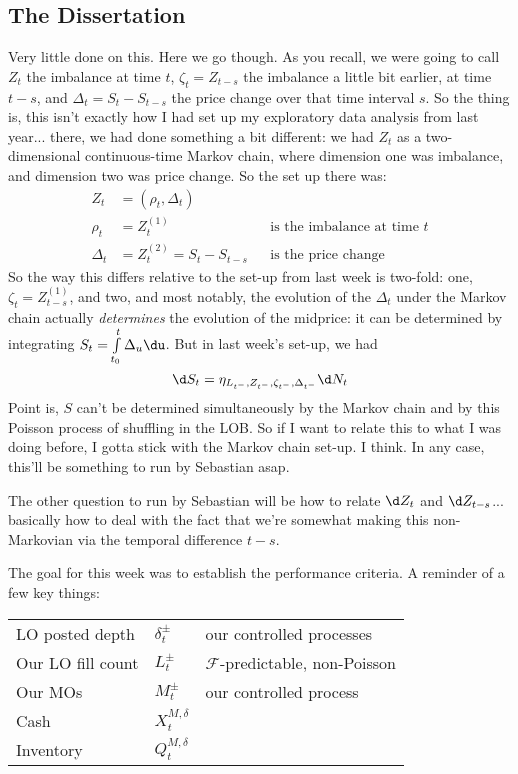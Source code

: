 \documentclass[12pt]{article}
\begin{document}
\subsection*{The Dissertation}
Very little done on this. Here we go though. As you recall, we were going to call $Z_t$ the imbalance at time $t$, $\zeta_t = Z_{t-s}$ the imbalance a little bit earlier, at time $t-s$, and $\Delta_{t} = S_t - S_{t-s}$ the price change over that time interval $s$. So the thing is, this isn't exactly how I had set up my exploratory data analysis from last year... there, we had done something a bit different: we had $Z_t$ as a two-dimensional continuous-time Markov chain, where dimension one was imbalance, and dimension two was price change. So the set up there was:
\begin{align}
Z_t & = (\rho_t, \Delta_t) \\
\rho_t & = Z_t^{(1)} && \text{is the imbalance at time $t$} \\
\Delta_t & = Z_t^{(2)} = S_t - S_{t-s} && \text{is the price change}
\end{align}
So the way this differs relative to the set-up from last week is two-fold: one, $\zeta_t = Z_{t-s}^{(1)}$, and two, and most notably, the evolution of the $\Delta_t$ under the Markov chain actually \textit{determines} the evolution of the midprice: it can be determined by integrating $S_t = \int\limits_{t_0}^t \Delta_u \du$. But in last week's set-up, we had
\begin{equation}\label{eq:stockprocess}
\d S_t = \eta_{L_{t^-},Z_{t^-},\zeta_{t^-},\Delta_{t^-}} \d N_t
\end{equation}
Point is, $S$ can't be determined simultaneously by the Markov chain and by this Poisson process of shuffling in the LOB. So if I want to relate this to what I was doing before, I gotta stick with the Markov chain set-up. I think. In any case, this'll be something to run by Sebastian asap. 

The other question to run by Sebastian will be how to relate $\d Z_t$ and $\d Z_{t-s}$... basically how to deal with the fact that we're somewhat making this non-Markovian via the temporal difference $t-s$. 

The goal for this week was to establish the performance criteria. A reminder of a few key things:

\begin{tabular}{lll}
LO posted depth & $\delta^{\pm}_t$ & our controlled processes \\
Our LO fill count & $L^{\pm}_t$ & $\mathcal{F}$-predictable, non-Poisson \\
Our MOs & $M^{\pm}_t$ & our controlled process \\
Cash & $X^{M, \delta}_t$ & \\
Inventory & $Q^{M, \delta}_t$ & \\
\end{tabular}
\end{document}
